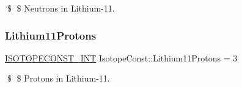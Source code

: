 \$ \$ Neutrons in Lithium-\/11. \mbox{\label{group___isotope_const-_lithium-_li11_ga949e96552859e7568b695a0164d59a6e}} 
\subsubsection{\texorpdfstring{Lithium11\+Protons}{Lithium11Protons}}
{\footnotesize\ttfamily \mbox{\hyperlink{group___isotope_const-_macros_ga5f18360b3e99483a35c32d789e62621c}{I\+S\+O\+T\+O\+P\+E\+C\+O\+N\+S\+T\+\_\+\+I\+NT}} Isotope\+Const\+::\+Lithium11\+Protons = 3}

\$ \$ Protons in Lithium-\/11. 